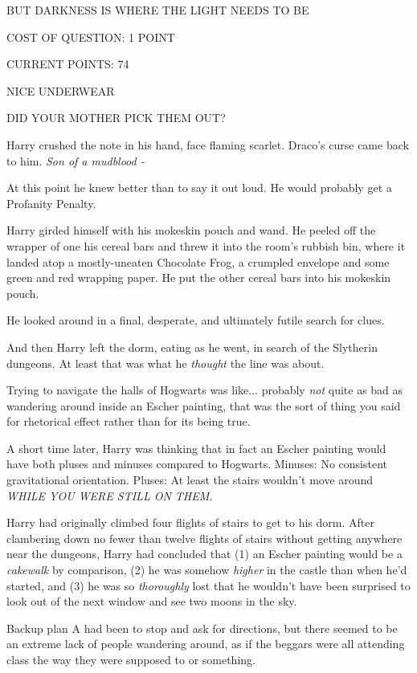 BUT DARKNESS IS WHERE THE LIGHT NEEDS TO BE

COST OF QUESTION: 1 POINT

CURRENT POINTS: 74

NICE UNDERWEAR

DID YOUR MOTHER PICK THEM OUT?

Harry crushed the note in his hand, face flaming scarlet. Draco's curse
came back to him. \emph{Son of a mudblood -}

At this point he knew better than to say it out loud. He would probably
get a Profanity Penalty.

Harry girded himself with his mokeskin pouch and wand. He peeled off the
wrapper of one his cereal bars and threw it into the room's rubbish bin,
where it landed atop a mostly-uneaten Chocolate Frog, a crumpled
envelope and some green and red wrapping paper. He put the other cereal
bars into his mokeskin pouch.

He looked around in a final, desperate, and ultimately futile search for
clues.

And then Harry left the dorm, eating as he went, in search of the
Slytherin dungeons. At least that was what he \emph{thought} the line
was about.

Trying to navigate the halls of Hogwarts was like... probably
\emph{not} quite as bad as wandering around inside an Escher painting,
that was the sort of thing you said for rhetorical effect rather than
for its being true.

A short time later, Harry was thinking that in fact an Escher painting
would have both pluses and minuses compared to Hogwarts. Minuses: No
consistent gravitational orientation. Pluses: At least the stairs
wouldn't move around \emph{WHILE YOU WERE STILL ON THEM.}

Harry had originally climbed four flights of stairs to get to his dorm.
After clambering down no fewer than twelve flights of stairs without
getting anywhere near the dungeons, Harry had concluded that (1) an
Escher painting would be a \emph{cakewalk} by comparison, (2) he was
somehow \emph{higher} in the castle than when he'd started, and (3) he
was so \emph{thoroughly} lost that he wouldn't have been surprised to
look out of the next window and see two moons in the sky.

Backup plan A had been to stop and ask for directions, but there seemed
to be an extreme lack of people wandering around, as if the beggars were
all attending class the way they were supposed to or something.

